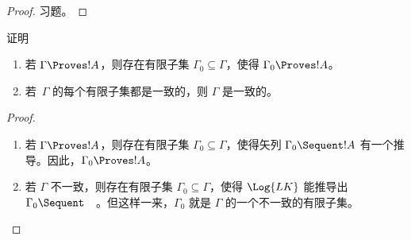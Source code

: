 \documentclass[../../../include/open-logic-section]{subfiles}
\begin{document}
\begin{proof}
习题。
\end{proof}

\begin{prob}
证明 
\end{prob}

\begin{prop}[紧致性]
  \begin{enumerate}
  \item 若 $\Gamma \Proves !A$，则存在有限子集 $\Gamma_0 \subseteq \Gamma$，使得 $\Gamma_0 \Proves !A$。
  \item 若~$\Gamma$ 的每个有限子集都是一致的，则 $\Gamma$ 是一致的。
  \end{enumerate}
\end{prop}

\begin{proof}
  \begin{enumerate}
    \item 若 $\Gamma \Proves !A$，则存在有限子集 $\Gamma_0 \subseteq \Gamma$，使得矢列 $\Gamma_0 \Sequent !A$ 有一个推导。因此，$\Gamma_0 \Proves !A$。
    \item 若 $\Gamma$ 不一致，则存在有限子集 $\Gamma_0 \subseteq \Gamma$，使得 $\Log{LK}$ 能推导出 $\Gamma_0 \Sequent \quad$。但这样一来，$\Gamma_0$ 就是 $\Gamma$ 的一个不一致的有限子集。
  \end{enumerate}
\end{proof}
\end{document}
